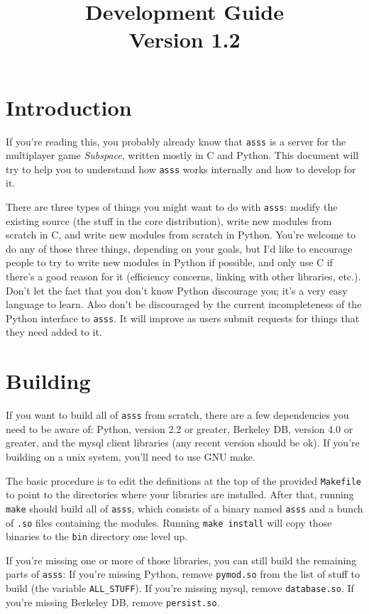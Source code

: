 \documentclass{article}
\title{\asss{} Development Guide\\Version 1.2}
\newcommand{\asss}{\texttt{asss}}
\begin{document}
\maketitle

\section{Introduction}

If you're reading this, you probably already know that \asss{} is a
server for the multiplayer game \emph{Subspace}, written mostly in C and
Python. This document will try to help you to understand how \asss{}
works internally and how to develop for it.

There are three types of things you might want to do with \asss{}:
modify the existing source (the stuff in the core distribution), write
new modules from scratch in C, and write new modules from scratch in
Python. You're welcome to do any of those three things, depending on
your goals, but I'd like to encourage people to try to write new modules
in Python if possible, and only use C if there's a good reason for it
(efficiency concerns, linking with other libraries, etc.). Don't let the
fact that you don't know Python discourage you; it's a very easy
language to learn. Also don't be discouraged by the current
incompleteness of the Python interface to \asss{}. It will improve as
users submit requests for things that they need added to it.


\section{Building}

If you want to build all of \asss{} from scratch, there are a few
dependencies you need to be aware of: Python, version 2.2 or greater,
Berkeley DB, version 4.0 or greater, and the mysql client libraries (any
recent version should be ok). If you're building on a unix system,
you'll need to use GNU make.

The basic procedure is to edit the definitions at the top of the
provided \verb/Makefile/ to point to the directories where your
libraries are installed. After that, running \verb/make/ should build
all of \asss{}, which consists of a binary named \verb/asss/ and a bunch
of \verb/.so/ files containing the modules. Running \verb/make install/
will copy those binaries to the \verb/bin/ directory one level up.

If you're missing one or more of those libraries, you can still build
the remaining parts of \asss{}: If you're missing Python, remove
\verb/pymod.so/ from the list of stuff to build (the variable
\verb/ALL_STUFF/). If you're missing mysql, remove \verb/database.so/.
If you're missing Berkeley DB, remove \verb/persist.so/.
\end{document}
